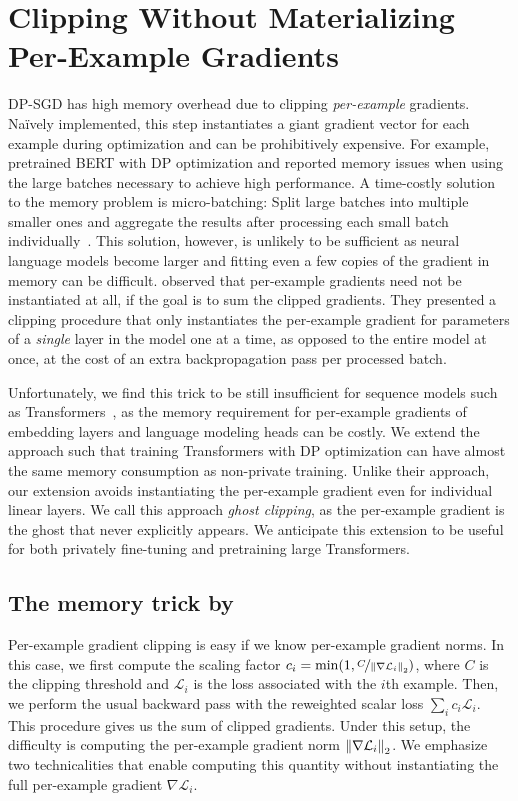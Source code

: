 
\section[Clipping Without Materializing Per-Example Gradients]{\large Clipping Without Materializing Per-Example Gradients}
DP-SGD has high memory overhead due to clipping \textit{per-example} gradients.
Na\"ively implemented, this step instantiates a giant gradient vector for each example during optimization and can be prohibitively expensive.
For example, \cite{hoory2021learning} pretrained BERT with DP optimization and reported memory issues when using the large batches necessary to achieve high performance.
A time-costly solution to the memory problem is micro-batching: Split large batches into multiple smaller ones and aggregate the results after processing each small batch individually~\citep{tramer2020differentially}.
This solution, however, is unlikely to be sufficient as neural language models become larger and fitting even a few copies of the gradient in memory can be difficult.
\cite{lee2020scaling} observed that per-example gradients need not be instantiated at all, if the goal is to sum the clipped gradients. 
They presented a clipping procedure that only instantiates the per-example gradient for parameters of a \textit{single} layer in the model one at a time, as opposed to the entire model at once, at the cost of an extra backpropagation pass per processed batch. 


Unfortunately, we find this trick to be still insufficient for sequence models such as Transformers~\citep{vaswani2017attention}, as the memory requirement for per-example gradients of embedding layers and language modeling heads can be costly. We extend the \cite{lee2020scaling} approach such that training Transformers with DP optimization can have almost the same memory consumption as non-private training. 
Unlike their approach, our extension avoids instantiating the per-example gradient even for individual linear layers.
We call this approach \textit{ghost clipping}, as the per-example gradient is the ghost that never explicitly appears.
We anticipate this extension to be useful for both privately fine-tuning and pretraining large Transformers.

\subsection{The memory trick by~\cite{lee2020scaling}}
Per-example gradient clipping is easy if we know per-example gradient norms. In this case, we first compute the scaling factor $c_i = \min(1, \nicefrac{C}{ \left\lVert \nabla \mathcal{L}_i\right\rVert_2 })$, where $C$ is the clipping threshold and $\mathcal{L}_i$ is the loss associated with the $i$th example. Then, we perform the usual backward pass with the reweighted scalar loss $ \sum_{i} c_i \mathcal{L}_i $. This procedure gives us the sum of clipped gradients.
Under this setup, the difficulty is computing the per-example gradient norm $\left\lVert\nabla \mathcal{L}_i\right\rVert_2$. 
We emphasize two technicalities that enable computing this quantity without instantiating the full per-example gradient $\nabla \mathcal{L}_i$. 

